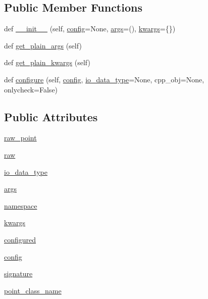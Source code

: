 \subsection*{Public Member Functions}
\begin{DoxyCompactItemize}
\item 
def \hyperlink{classmui4py_1_1common_1_1_cpp_class_af71dd873bcff2f831b48d0d81f900c16}{\+\_\+\+\_\+init\+\_\+\+\_\+} (self, \hyperlink{classmui4py_1_1common_1_1_cpp_class_ac0ad2501063d600bb0101a269a817ce8}{config}=None, \hyperlink{classmui4py_1_1common_1_1_cpp_class_a29797823c6e21f22bba24ee7d35ef31d}{args}=(), \hyperlink{classmui4py_1_1common_1_1_cpp_class_af43879f06f07b1abf0d08e30c5ead46f}{kwargs}=\{\})
\item 
def \hyperlink{classmui4py_1_1common_1_1_cpp_class_a255b3ad646751b5ed10c1795638275e1}{get\+\_\+plain\+\_\+args} (self)
\item 
def \hyperlink{classmui4py_1_1common_1_1_cpp_class_a646e7d435bd4a8b053103bbc8b2368d7}{get\+\_\+plain\+\_\+kwargs} (self)
\item 
def \hyperlink{classmui4py_1_1common_1_1_cpp_class_a72df33d8f73522f22a53f2d476eda586}{configure} (self, \hyperlink{classmui4py_1_1common_1_1_cpp_class_ac0ad2501063d600bb0101a269a817ce8}{config}, \hyperlink{classmui4py_1_1common_1_1_cpp_class_a32aeb99991acd0d8d8604984099dc010}{io\+\_\+data\+\_\+type}=None, cpp\+\_\+obj=None, onlycheck=False)
\end{DoxyCompactItemize}
\subsection*{Public Attributes}
\begin{DoxyCompactItemize}
\item 
\hyperlink{classmui4py_1_1common_1_1_cpp_class_a74f857985586bedbfc71877feab9bb35}{raw\+\_\+point}
\item 
\hyperlink{classmui4py_1_1common_1_1_cpp_class_a7cd72d9f15e0159ec4124eee61861222}{raw}
\item 
\hyperlink{classmui4py_1_1common_1_1_cpp_class_a32aeb99991acd0d8d8604984099dc010}{io\+\_\+data\+\_\+type}
\item 
\hyperlink{classmui4py_1_1common_1_1_cpp_class_a29797823c6e21f22bba24ee7d35ef31d}{args}
\item 
\hyperlink{classmui4py_1_1common_1_1_cpp_class_aa45aca5328de14c2baa089fc9087f3cf}{namespace}
\item 
\hyperlink{classmui4py_1_1common_1_1_cpp_class_af43879f06f07b1abf0d08e30c5ead46f}{kwargs}
\item 
\hyperlink{classmui4py_1_1common_1_1_cpp_class_a7c23ce0b5a2dd5e8a255e5d27c2dd595}{configured}
\item 
\hyperlink{classmui4py_1_1common_1_1_cpp_class_ac0ad2501063d600bb0101a269a817ce8}{config}
\item 
\hyperlink{classmui4py_1_1common_1_1_cpp_class_acab1a6431c2c8d5c1ca73bd643199ff4}{signature}
\item 
\hyperlink{classmui4py_1_1common_1_1_cpp_class_ac7358f958eba2fdbbbdf1d945d2f0a3c}{point\+\_\+class\+\_\+name}
\end{DoxyCompactItemize}


